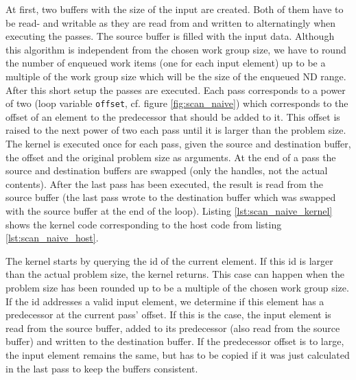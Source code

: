 At first, two buffers with the size of the input are created. Both of them have to be read- and writable as they are read from and written to alternatingly when executing the passes. The source buffer is filled with the input data. Although this algorithm is independent from the chosen work group size, we have to round the number of enqueued work items (one for each input element) up to be a multiple of the work group size which will be the size of the enqueued ND range. After this short setup the passes are executed. Each pass corresponds to a power of two (loop variable \lstinline!offset!, cf. figure \ref{fig:scan_naive}) which corresponds to the offset of an element to the predecessor that should be added to it. This offset is raised to the next power of two each pass until it is larger than the problem size. The kernel is executed once for each pass, given the source and destination buffer, the offset and the original problem size as arguments. At the end of a pass the source and destination buffers are swapped (only the handles, not the actual contents). After the last pass has been executed, the result is read from the source buffer (the last pass wrote to the destination buffer which was swapped with the source buffer at the end of the loop).
Listing \ref{lst:scan_naive_kernel} shows the kernel code corresponding to the host code from listing \ref{lst:scan_naive_host}.



\pagebreak

The kernel starts by querying the id of the current element. If this id is larger than the actual problem size, the kernel returns. This case can happen when the problem size has been rounded up to be a multiple of the chosen work group size. If the id addresses a valid input element, we determine if this element has a predecessor at the current pass' offset. If this is the case, the input element is read from the source buffer, added to its predecessor (also read from the source buffer) and written to the destination buffer. If the predecessor offset is to large, the input element remains the same, but has to be copied if it was just calculated in the last pass to keep the buffers consistent.

